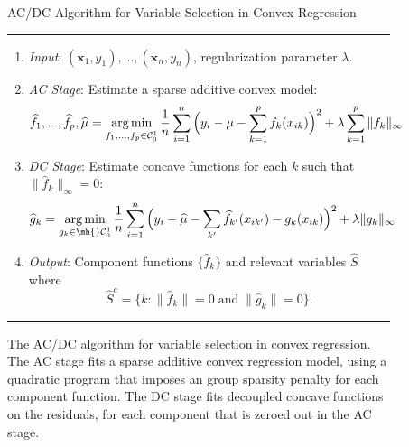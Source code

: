 \begin{figure}[t]
{\sc AC/DC Algorithm for Variable Selection in Convex Regression\hfill}
\vskip5pt
\begin{center}
\hrule
\vskip7pt
\normalsize
\begin{enumerate}
\item[] \textit{Input}:  $(\mathbf{x}_1, y_1), ..., (\mathbf{x}_n, y_n)$, regularization parameter $\lambda$.
\vskip5pt
\item[] \textit{AC Stage}:  Estimate a sparse additive convex model:
\begin{equation}
\label{eqn:scam2}
\widehat{f}_1, ..., \widehat{f}_p, \widehat\mu = \mathop{\text{\rm arg\,min}}_{f_1,...,f_p \in \mathcal{C}^1_0} 
   \frac{1}{n} \sum_{i=1}^n \Big(y_i - \mu-\sum_{k=1}^p f_k(x_{ik}) \Big)^2 
       + \lambda \sum_{k=1}^p \| f_k \|_\infty
\end{equation}
\vskip5pt
\item[] \textit{DC Stage}:  Estimate concave functions
 for each $k$ such that $\| \hat{f}_k \|_\infty = 0$:
\begin{equation}
\label{eqn:dc22}
\hat{g}_k = \argmin_{g_k \in \mh{}\C^1_0} 
   \frac{1}{n} \sum_{i=1}^n \Big( y_i - \hat \mu - \sum_{k'} \hat{f}_{k'}(x_{ik'}) 
    - g_k(x_{ik})\Big)^2 
      + \lambda \| g_k \|_\infty
\end{equation}
\item[] \textit{Output}: Component functions $\{\hat f_k\}$ and 
relevant variables $\hat S$ where
\begin{equation}
\hat S^c = \bigl\{k : \| \hat{f}_k \| =
0 \; \mathrm{and}\; \|\hat{g}_k \|=0\bigr\}.
\end{equation}
\end{enumerate}
\vskip3pt
\hrule
\end{center}
\vskip0pt
\caption{The AC/DC algorithm for variable selection in convex
  regression.  The AC stage fits a sparse additive convex regression
  model, using a quadratic program that imposes an group sparsity
  penalty for each component function.  The DC stage fits
  decoupled concave functions on the residuals, for each 
  component that is zeroed out in the AC stage.}
\label{fig:backfitting:algo}
\end{figure}


 
